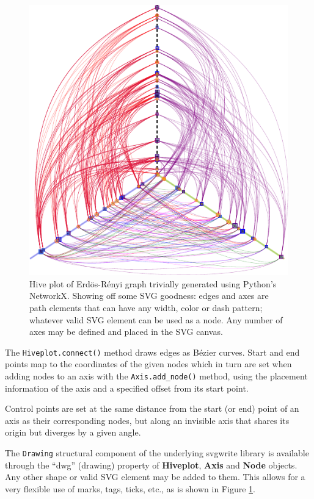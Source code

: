 \documentclass{bioinfo}
\begin{document}
\begin{figure}[th!]
  \centerline{\includegraphics[scale=0.8]{example.pdf}}
  \caption{Hive plot of Erd\"os-R\'enyi graph trivially generated
    using Python's NetworkX. Showing off some SVG goodness: edges and
    axes are path elements that can have any width, color or dash
    pattern; whatever valid SVG element can be used as a node. Any
    number of axes may be defined and placed in the SVG canvas.}
  \label{fig:01}
\end{figure}


The \verb"Hiveplot.connect()" method draws edges as B\'ezier curves.
Start and end points map to the coordinates of the given nodes which
in turn are set when adding nodes to an axis with the
\verb"Axis.add_node()" method, using the placement information of the
axis and a specified offset from its start point.

Control points are set at the same distance from the start (or end)
point of an axis as their corresponding nodes, but along an invisible
axis that shares its origin but diverges by a given angle.

The \verb"Drawing" structural component of the underlying svgwrite
library is available through the ``dwg'' (drawing)
property of {\bfseries Hiveplot}, {\bfseries Axis} and {\bfseries
  Node} objects. Any other shape or valid SVG element may be added to
them. This allows for a very flexible use of marks, tags, ticks, etc.,
as is shown in Figure \ref{fig:01}.
\end{document}
